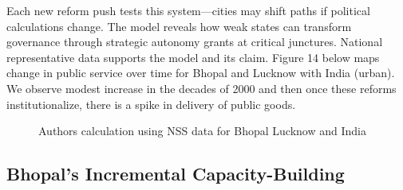 Each new reform push tests this system—cities may shift paths if political calculations change. The model reveals how weak states can transform governance through strategic autonomy grants at critical junctures. National representative data supports the model and its claim. Figure 14 below maps change in public service over time for Bhopal and Lucknow with India (urban). We observe modest increase in the decades of 2000 and then once these reforms institutionalize, there is a spike in delivery of public goods.

\begin{figure}[htbp]
\centering
\caption{Authors calculation using NSS data for Bhopal Lucknow and India}
\label{fig:nss_data}
\end{figure}

\subsection{Bhopal's Incremental Capacity-Building}

